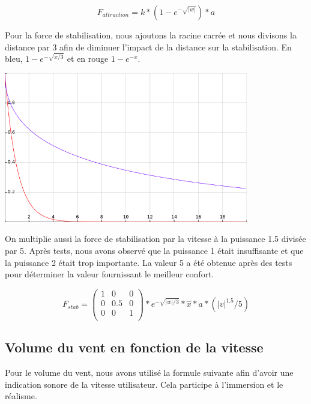 \documentclass[a4paper]{elsarticle}
\begin{document}
\begin{equation}
    F_{attraction} = k * (1 - e^{-\sqrt{|w|}}) * a
\end{equation}

Pour la force de stabilisation, nous ajoutons la racine carrée et nous divisons la distance par 3 afin de diminuer l'impact de la distance sur la stabilisation. En bleu, $1-e^{-\sqrt{x / 3}}$ et en rouge $1-e^{-x}$.

\begin{center}
\includegraphics[width=0.8\textwidth]{exp_sqrt_3_non_3.png}
\end{center}

On multiplie aussi la force de stabilisation par la vitesse à la puissance 1.5 divisée par 5. Après tests, nous avons observé que la puissance 1 était insuffisante et que la puissance 2 était trop importante. La valeur 5 a été obtenue après des tests pour déterminer la valeur fournissant le meilleur confort.

\begin{equation}
    F_{stab} = \left( {\begin{array}{ccc}
   1 & 0 & 0\\
   0 & 0.5 & 0\\
   0 & 0 & 1\\
  \end{array} } \right) * e^{-\sqrt{|w| / 3}} * \hat{x} * a * (|v|^{1.5} / 5)
\end{equation}

\subsection{Volume du vent en fonction de la vitesse}

Pour le volume du vent, nous avons utilisé la formule suivante afin d'avoir une indication sonore de la vitesse utilisateur. Cela participe à l'immersion et le réalisme.
\end{document}
